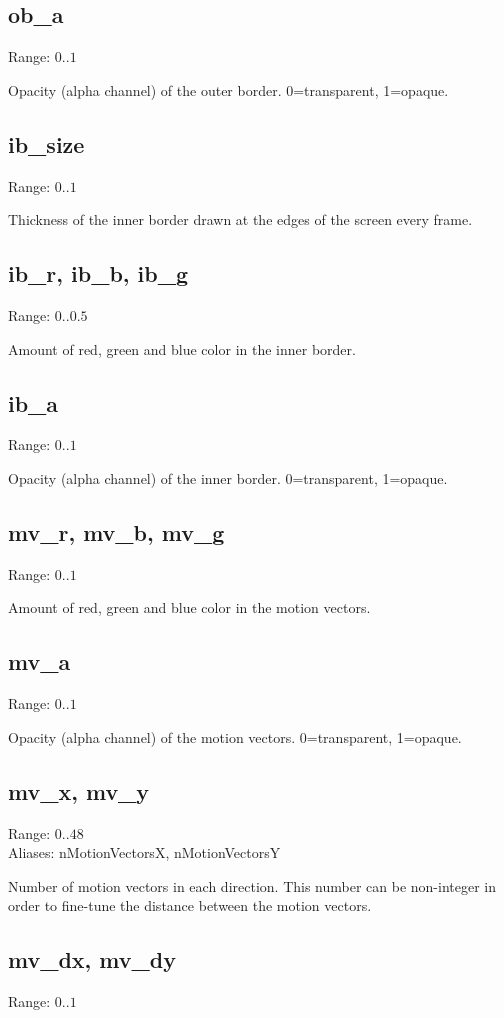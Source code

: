 \documentclass[11pt, a5paper, pagesize]{scrbook}
\begin{document}
\subsection{ob\_a}
Range: $0..1$

Opacity (alpha channel) of the outer border. 0=transparent, 1=opaque.

\subsection{ib\_size}
Range: $0..1$

Thickness of the inner border drawn at the edges of the screen every frame.

\subsection{ib\_r, ib\_b, ib\_g}
Range: $0..0.5$

Amount of red, green and blue color in the inner border.

\subsection{ib\_a}
Range: $0..1$

Opacity (alpha channel) of the inner border. 0=transparent, 1=opaque.

\subsection{mv\_r, mv\_b, mv\_g}
Range: $0..1$

Amount of red, green and blue color in the motion vectors.

\subsection{mv\_a}
Range: $0..1$

Opacity (alpha channel) of the motion vectors. 0=transparent, 1=opaque.

\subsection{mv\_x, mv\_y}
Range: $0..48$\\
Aliases: nMotionVectorsX, nMotionVectorsY

Number of motion vectors in each direction. This number can be non-integer in order to fine-tune the distance between the motion vectors.

\subsection{mv\_dx, mv\_dy}
Range: $0..1$
\end{document}
